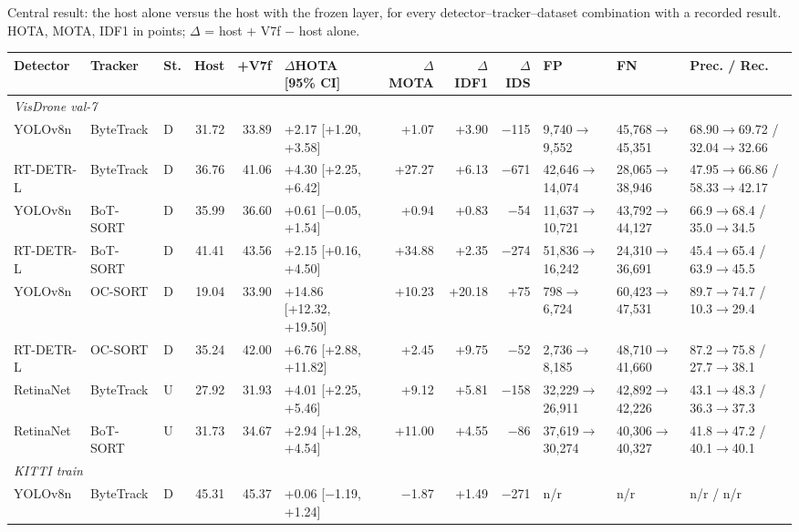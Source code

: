 \begin{sidewaystableorg}
\centering
\caption{Central result: the host alone versus the host with the frozen layer, for every detector--tracker--dataset combination with a recorded result. HOTA, MOTA, IDF1 in points; $\Delta$ = host + V7f $-$ host alone.}
\label{tab:central}
\footnotesize
\setlength\tabcolsep{3.5pt}
\begin{adjustbox}{max width=\linewidth}
\begin{tabular}{lllrrlrrrlll}
\toprule
Detector & Tracker & St. & Host & +V7f & $\Delta$HOTA [95\% CI] & $\Delta$MOTA & $\Delta$IDF1 & $\Delta$IDS & FP & FN & Prec. / Rec. \\
\midrule
\multicolumn{12}{l}{\textit{VisDrone val-7}} \\
YOLOv8n & ByteTrack & D & 31.72 & 33.89 & +2.17 [+1.20, +3.58] & +1.07 & +3.90 & \ensuremath{-}115 & 9,740$\to$9,552 & 45,768$\to$45,351 & 68.90$\to$69.72 / 32.04$\to$32.66 \\
RT-DETR-L & ByteTrack & D & 36.76 & 41.06 & +4.30 [+2.25, +6.42] & +27.27 & +6.13 & \ensuremath{-}671 & 42,646$\to$14,074 & 28,065$\to$38,946 & 47.95$\to$66.86 / 58.33$\to$42.17 \\
YOLOv8n & BoT-SORT & D & 35.99 & 36.60 & +0.61 [\ensuremath{-}0.05, +1.54] & +0.94 & +0.83 & \ensuremath{-}54 & 11,637$\to$10,721 & 43,792$\to$44,127 & 66.9$\to$68.4 / 35.0$\to$34.5 \\
RT-DETR-L & BoT-SORT & D & 41.41 & 43.56 & +2.15 [+0.16, +4.50] & +34.88 & +2.35 & \ensuremath{-}274 & 51,836$\to$16,242 & 24,310$\to$36,691 & 45.4$\to$65.4 / 63.9$\to$45.5 \\
YOLOv8n & OC-SORT & D & 19.04 & 33.90 & +14.86 [+12.32, +19.50] & +10.23 & +20.18 & +75 & 798$\to$6,724 & 60,423$\to$47,531 & 89.7$\to$74.7 / 10.3$\to$29.4 \\
RT-DETR-L & OC-SORT & D & 35.24 & 42.00 & +6.76 [+2.88, +11.82] & +2.45 & +9.75 & \ensuremath{-}52 & 2,736$\to$8,185 & 48,710$\to$41,660 & 87.2$\to$75.8 / 27.7$\to$38.1 \\
RetinaNet & ByteTrack & U & 27.92 & 31.93 & +4.01 [+2.25, +5.46] & +9.12 & +5.81 & \ensuremath{-}158 & 32,229$\to$26,911 & 42,892$\to$42,226 & 43.1$\to$48.3 / 36.3$\to$37.3 \\
RetinaNet & BoT-SORT & U & 31.73 & 34.67 & +2.94 [+1.28, +4.54] & +11.00 & +4.55 & \ensuremath{-}86 & 37,619$\to$30,274 & 40,306$\to$40,327 & 41.8$\to$47.2 / 40.1$\to$40.1 \\
\multicolumn{12}{l}{\textit{KITTI train}} \\
YOLOv8n & ByteTrack & D & 45.31 & 45.37 & +0.06 [\ensuremath{-}1.19, +1.24] & \ensuremath{-}1.87 & +1.49 & \ensuremath{-}271 & n/r & n/r & n/r / n/r \\

\end{tabular}
\end{adjustbox}
\end{sidewaystableorg}
